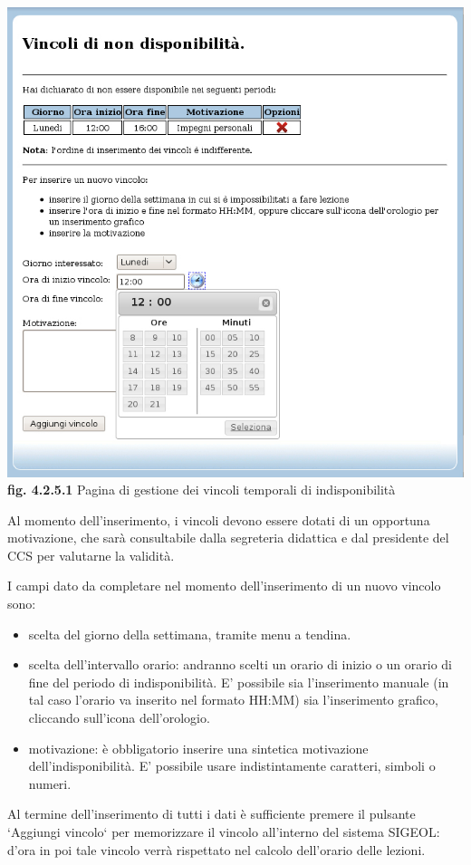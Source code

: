 \documentclass[11pt,a4paper]{article}
\begin{document}
\begin{center}
	\includegraphics[scale=0.5]{images/vincoli_docente.jpg}\\
	\textbf{fig. 4.2.5.1} Pagina di gestione dei vincoli temporali di indisponibilità\\
\end{center}
\bigskip

Al momento dell'inserimento, i vincoli devono essere dotati di un opportuna motivazione, che sarà consultabile dalla segreteria didattica e dal presidente del CCS per valutarne la validità.

I campi dato da completare nel momento dell'inserimento di un nuovo vincolo sono:
\begin{itemize}
 \item scelta del giorno della settimana, tramite menu a tendina.
 \item scelta dell'intervallo orario: andranno scelti un orario di inizio o un orario di fine del periodo di indisponibilità. E' possibile sia l'inserimento manuale (in tal caso l'orario va inserito nel formato HH:MM) sia l'inserimento grafico, cliccando sull'icona dell'orologio.
 \item motivazione: è obbligatorio inserire una sintetica motivazione dell'indisponibilità. E' possibile usare indistintamente caratteri, simboli o numeri.
\end{itemize}
Al termine dell'inserimento di tutti i dati è sufficiente premere il pulsante `Aggiungi vincolo` per memorizzare il vincolo all'interno del sistema SIGEOL: d'ora in poi tale vincolo verrà rispettato nel calcolo dell'orario delle lezioni.
\end{document}

